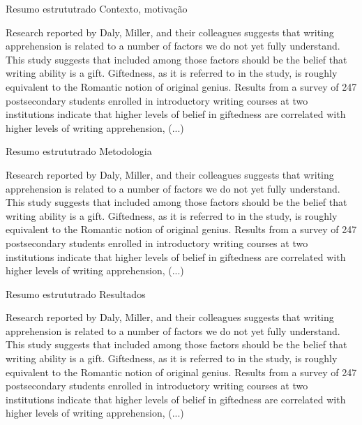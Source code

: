 \documentclass{beamer}
\begin{document}
\begin{frame}{Resumo estrututrado}
  Contexto, motivação
  \begin{example}
    \alert{Research reported by Daly, Miller, and their colleagues
      suggests that writing apprehension is related to a number of
      factors we do not yet fully understand. This study suggests that
      included among those factors should be the belief that writing
      ability is a gift. Giftedness, as it is referred to in the
      study, is roughly equivalent to the Romantic notion of original
      genius.} Results from a survey of 247 postsecondary students
    enrolled in introductory writing courses at two institutions
    indicate that higher levels of belief in giftedness are correlated
    with higher levels of writing apprehension, (...)
  \end{example}
\end{frame}

\begin{frame}{Resumo estrututrado}
Metodologia
  \begin{example}
    Research reported by Daly, Miller, and their colleagues suggests
    that writing apprehension is related to a number of factors we do
    not yet fully understand. This study suggests that included among
    those factors should be the belief that writing ability is a
    gift. Giftedness, as it is referred to in the study, is roughly
    equivalent to the Romantic notion of original genius. Results from
    \alert{a survey of 247 postsecondary students enrolled in
      introductory writing courses at two institutions} indicate that
    higher levels of belief in giftedness are correlated with higher
    levels of writing apprehension, (...)
  \end{example}
\end{frame}

\begin{frame}{Resumo estrututrado}
Resultados
  \begin{example}
    Research reported by Daly, Miller, and their colleagues suggests
    that writing apprehension is related to a number of factors we do
    not yet fully understand. This study suggests that included among
    those factors should be the belief that writing ability is a
    gift. Giftedness, as it is referred to in the study, is roughly
    equivalent to the Romantic notion of original
    genius. \alert{Results} from a survey of 247 postsecondary
    students enrolled in introductory writing courses at two
    institutions \alert{indicate that higher levels of belief in
      giftedness are correlated with higher levels of writing
      apprehension,} (...)
  \end{example}
\end{frame}
\end{document}
